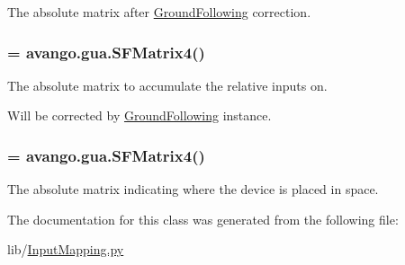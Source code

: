 \-The absolute matrix after \hyperlink{namespacelib_1_1GroundFollowing}{\-Ground\-Following} correction. 

\hypertarget{classlib_1_1InputMapping_1_1InputMapping_ac7a4f5655e3bc96a8f797e2b1c0b4a84}{
\subsubsection[{sf\-\_\-abs\-\_\-uncorrected\-\_\-mat}]{ = avango.\-gua.\-S\-F\-Matrix4()}}\label{classlib_1_1InputMapping_1_1InputMapping_ac7a4f5655e3bc96a8f797e2b1c0b4a84}


\-The absolute matrix to accumulate the relative inputs on. 

\-Will be corrected by \hyperlink{namespacelib_1_1GroundFollowing}{\-Ground\-Following} instance. \hypertarget{classlib_1_1InputMapping_1_1InputMapping_a1b87d0b4819c4602c57873d4e51ad7d6}{
\subsubsection[{sf\-\_\-station\-\_\-mat}]{ = avango.\-gua.\-S\-F\-Matrix4()}}\label{classlib_1_1InputMapping_1_1InputMapping_a1b87d0b4819c4602c57873d4e51ad7d6}


\-The absolute matrix indicating where the device is placed in space. 



\-The documentation for this class was generated from the following file\-:\begin{DoxyCompactItemize}
\item 
lib/\hyperlink{InputMapping_8py}{\-Input\-Mapping.\-py}\end{DoxyCompactItemize}
